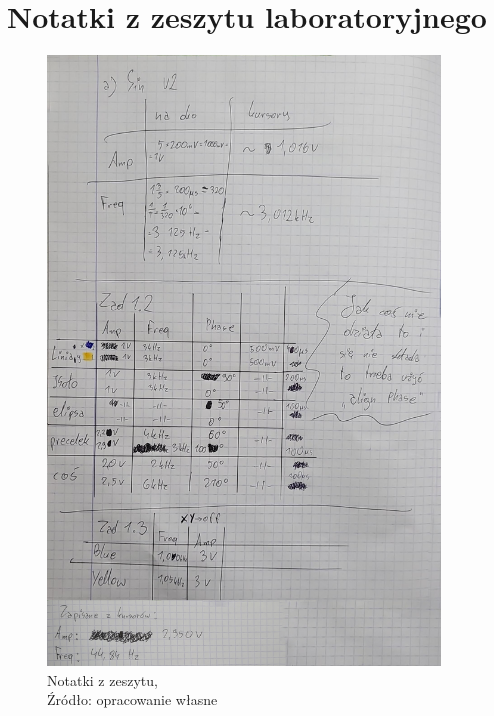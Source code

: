 \documentclass{article}
\begin{document}
    \pagebreak

  \section{Notatki z zeszytu laboratoryjnego}
  \begin{figure}[h]
    \centering
    \begin{minipage}{0.45\textwidth}
        \centering
        \includegraphics[width=0.93\textwidth]{grafiki/notatki1.jpg} 
        \caption{Notatki z zeszytu,\\Źródło: opracowanie własne}
    \end{minipage}\hfill
    \begin{minipage}{0.45\textwidth}
        \centering

\end{minipage}
\end{figure}
\end{document}
